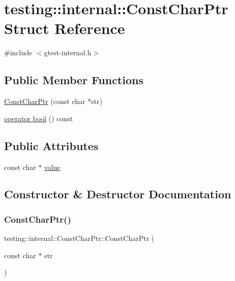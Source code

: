 \hypertarget{structtesting_1_1internal_1_1ConstCharPtr}{}\section{testing\+:\+:internal\+:\+:Const\+Char\+Ptr Struct Reference}
\label{structtesting_1_1internal_1_1ConstCharPtr}


{\ttfamily \#include $<$gtest-\/internal.\+h$>$}

\subsection*{Public Member Functions}
\begin{DoxyCompactItemize}
\item 
\hyperlink{structtesting_1_1internal_1_1ConstCharPtr_ae94f6453fa679d815994eccc63062907}{Const\+Char\+Ptr} (const char $\ast$str)
\item 
\hyperlink{structtesting_1_1internal_1_1ConstCharPtr_a85c8174b5d4db8fe96863509ba767b27}{operator bool} () const
\end{DoxyCompactItemize}
\subsection*{Public Attributes}
\begin{DoxyCompactItemize}
\item 
const char $\ast$ \hyperlink{structtesting_1_1internal_1_1ConstCharPtr_adba40d23d5986904b605946f643cf26e}{value}
\end{DoxyCompactItemize}


\subsection{Constructor \& Destructor Documentation}
\mbox{\label{structtesting_1_1internal_1_1ConstCharPtr_ae94f6453fa679d815994eccc63062907}} 
\subsubsection{\texorpdfstring{Const\+Char\+Ptr()}{ConstCharPtr()}}
{\footnotesize\ttfamily testing\+::internal\+::\+Const\+Char\+Ptr\+::\+Const\+Char\+Ptr (\begin{DoxyParamCaption}\item[{const char $\ast$}]{str }\end{DoxyParamCaption})\hspace{0.3cm}{\ttfamily [inline]}}



